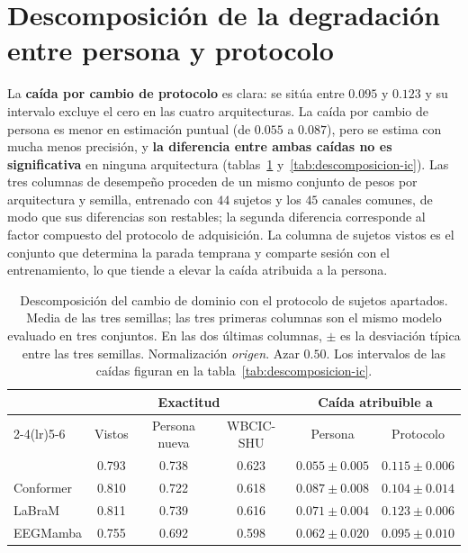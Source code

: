 \section{Descomposición de la degradación entre persona y protocolo}
\label{sec:descomposicion}

La \textbf{caída por cambio de protocolo} es clara: se sitúa entre $0.095$ y $0.123$ y su intervalo excluye
el cero en las cuatro arquitecturas. La caída por cambio de persona es menor en estimación puntual (de
$0.055$ a $0.087$), pero se estima con mucha menos precisión, y \textbf{la diferencia entre ambas caídas no
es significativa} en ninguna arquitectura (tablas~\ref{tab:descomposicion} y~\ref{tab:descomposicion-ic}).
Las tres columnas de desempeño proceden de un mismo conjunto de pesos por arquitectura y semilla, entrenado
con $44$ sujetos y los $45$ canales comunes, de modo que sus diferencias son restables; la segunda diferencia
corresponde al factor compuesto del protocolo de adquisición. La columna de sujetos vistos es el conjunto
que determina la parada temprana y comparte sesión con el entrenamiento, lo que tiende a elevar la caída
atribuida a la persona.

\begin{table}[H]
\centering
\caption{Descomposición del cambio de dominio con el protocolo de sujetos apartados. Media de
las tres semillas; las tres primeras columnas son el mismo modelo evaluado en tres conjuntos. En las dos
últimas columnas, $\pm$ es la desviación típica entre las tres semillas. Normalización
\emph{origen}. Azar $0.50$. Los intervalos de las caídas figuran en la
tabla~\ref{tab:descomposicion-ic}.}
\label{tab:descomposicion}
\small
\begin{tabular}{lccccc}
\toprule
 & \multicolumn{3}{c}{\textbf{Exactitud}} & \multicolumn{2}{c}{\textbf{Caída atribuible a}} \\
\cmidrule(lr){2-4}\cmidrule(lr){5-6}
 & Vistos & Persona nueva & WBCIC-SHU & Persona & Protocolo \\
\midrule
\eegnet{} & 0.793 & 0.738 & 0.623 & $0.055 \pm 0.005$ & $0.115 \pm 0.006$ \\
Conformer & 0.810 & 0.722 & 0.618 & $0.087 \pm 0.008$ & $0.104 \pm 0.014$ \\
LaBraM & 0.811 & 0.739 & 0.616 & $0.071 \pm 0.004$ & $0.123 \pm 0.006$ \\
EEGMamba & 0.755 & 0.692 & 0.598 & $0.062 \pm 0.020$ & $0.095 \pm 0.010$ \\
\bottomrule
\end{tabular}
\end{table}

